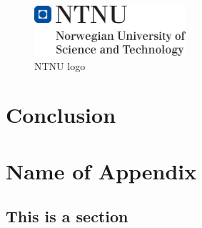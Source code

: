 \documentclass{tpk4170report}
\begin{document}
\Blindtext

\begin{figure}
  \centering
  \includegraphics[width=0.5\textwidth]{hovedlogo} 
  \caption{NTNU logo}
  \label{fig:logo}
\end{figure}





\chapter{Conclusion}

\blindtext[4]



\printbibliography[title=References]

\appendix
\chapter{Name of Appendix} 

\section{This is a section}
\end{document}
